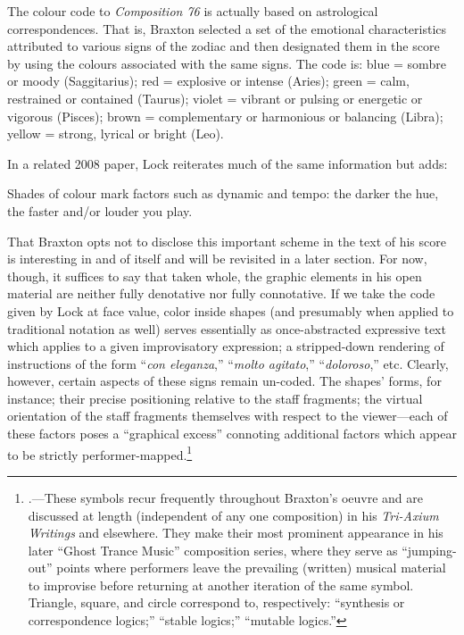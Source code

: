             \begin{smallquote}
                The colour code to \textit{Composition 76} is actually based on astrological correspondences. That is, Braxton selected a set of the emotional characteristics attributed to various signs of the zodiac and then designated them in the score by using the colours associated with the same signs. The code is: blue = sombre or moody (Saggitarius); red = explosive or intense (Aries); green = calm, restrained or contained (Taurus); violet = vibrant or pulsing or energetic or vigorous (Pisces); brown = complementary or harmonious or balancing (Libra); yellow = strong, lyrical or bright (Leo).\autocite[222]{Lock_1989}
            \end{smallquote}
        
        In a related 2008 paper, Lock reiterates much of the same information but adds:
        
            \begin{smallquote}
                Shades of colour mark factors such as dynamic and tempo: the darker the hue, the faster and/or louder you play.\autocite{Lock_2008}
            \end{smallquote}
    
        That Braxton opts not to disclose this important scheme in the text of his score is interesting in and of itself and will be revisited in a later section. For now, though, it suffices to say that taken whole, the graphic elements in his open material are neither fully denotative nor fully connotative. If we take the code given by Lock at face value, color inside shapes (and presumably when applied to traditional notation as well) serves essentially as once-abstracted expressive text which applies to a given improvisatory expression; a stripped-down rendering of instructions of the form ``\textit{con eleganza},'' ``\textit{molto agitato},'' ``\textit{doloroso},'' etc. Clearly, however, certain aspects of these signs remain un-coded. The shapes' forms, for instance; their precise positioning relative to the staff fragments; the virtual orientation of the staff fragments themselves with respect to the viewer---each of these factors poses a ``graphical excess'' connoting additional factors which appear to be strictly performer-mapped.\footnote{\autocite{Dicker_2016}.---These symbols recur frequently throughout Braxton's oeuvre and are discussed at length (independent of any one composition) in his \textit{Tri-Axium Writings} and elsewhere. They make their most prominent appearance in his later ``Ghost Trance Music'' composition series, where they serve as ``jumping-out'' points where performers leave the prevailing (written) musical material to improvise before returning at another iteration of the same symbol. Triangle, square, and circle correspond to, respectively: ``synthesis or correspondence logics;'' ``stable logics;'' ``mutable logics.''}
    
